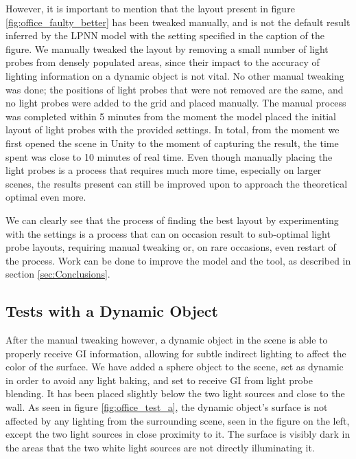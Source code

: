 However, it is important to mention that the layout present in figure \ref{fig:office_faulty_better} has been tweaked manually, and is not the default result inferred by the LPNN model with the setting specified in the caption of the figure. We manually tweaked the layout by removing a small number of light probes from densely populated areas, since their impact to the accuracy of lighting information on a dynamic object is not vital. No other manual tweaking was done; the positions of light probes that were not removed are the same, and no light probes were added to the grid and placed manually. The manual process was completed within 5 minutes from the moment the model placed the initial layout of light probes with the provided settings. In total, from the moment we first opened the scene in Unity to the moment of capturing the result, the time spent was close to 10 minutes of real time. Even though manually placing the light probes is a process that requires much more time, especially on larger scenes, the results present can still be improved upon to approach the theoretical optimal even more.

We can clearly see that the process of finding the best layout by experimenting with the settings is a process that can on occasion result to sub-optimal light probe layouts, requiring manual tweaking or, on rare occasions, even restart of the process. Work can be done to improve the model and the tool, as described in section \ref{sec:Conclusions}.\newline

\subsection*{Tests with a Dynamic Object}
After the manual tweaking however, a dynamic object in the scene is able to properly receive GI information, allowing for subtle indirect lighting to affect the color of the surface. We have added a sphere object to the scene, set as dynamic in order to avoid any light baking, and set to receive GI from light probe blending. It has been placed slightly below the two light sources and close to the wall. As seen in figure \ref{fig:office_test_a}, the dynamic object's surface is not affected by any lighting from the surrounding scene, seen in the figure on the left, except the two light sources in close proximity to it. The surface is visibly dark in the areas that the two white light sources are not directly illuminating it.

